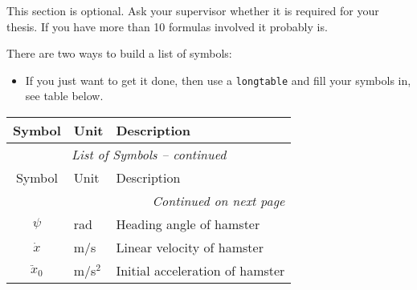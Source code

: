 \cleardoublepage
{}

This section is optional. 
Ask your supervisor whether it is required for your thesis. 
If you have more than 10 formulas involved it probably is.

There are two ways to build a list of symbols:

\begin{itemize}
    \item If you just want to get it done, then use a \texttt{longtable} and fill your symbols in, see table below.
\end{itemize}

\begin{center}
\begin{longtable}{@{}c l p{10cm}@{}}
\toprule
Symbol & Unit & Description \\
\midrule
\endfirsthead
\multicolumn{3}{c}{\textit{List of Symbols -- continued}}\\
\toprule
Symbol & Unit & Description \\
\midrule
\endhead
\bottomrule \multicolumn{3}{r}{\textit{Continued on next page}} \\
\endfoot
\bottomrule
\endlastfoot

\(\psi\) & rad & Heading angle of hamster \\
\(\dot x\) & m/s & Linear velocity of hamster \\
\(\ddot x_0\) & m/s$^2$ & Initial acceleration of hamster \\
\end{longtable}
\end{center}